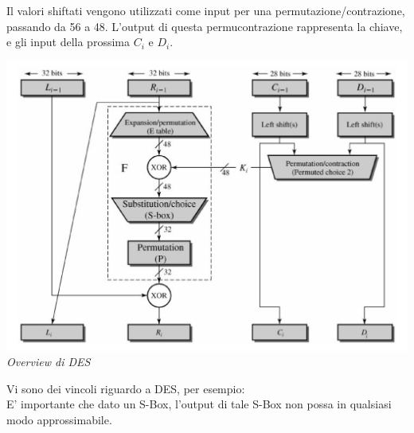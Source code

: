 \documentclass[11pt, oneside]{article}   	%
\begin{document}
Il valori shiftati vengono utilizzati come input per una permutazione/contrazione, passando da 56 a 48. L'output di questa permucontrazione rappresenta la chiave, e gli input della prossima $C_i$  e $D_i$.\\
\begin{center}
\includegraphics[scale= 0.5]{des3}\\
\emph{Overview di DES}
\end{center}
Vi sono dei vincoli riguardo a DES, per esempio:\\
E' importante che dato un S-Box, l'output di tale S-Box non possa in qualsiasi modo approssimabile.
\end{document}
